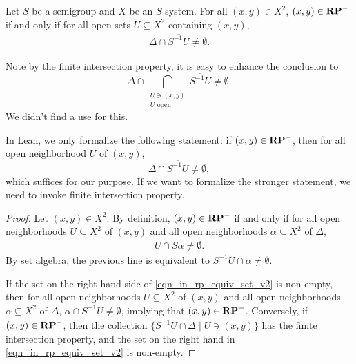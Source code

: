 \begin{lemma}
\label{lemma_rp_iff_nbhd_tran_int_hits_diagonal}
\leanok{}
    Let $S$ be a semigroup and $X$ be an $S$-system.  For all $(x,y) \in X^2$, $(x,y) \in \mathbf{RP}^-$ if and only if for all open sets $U \subseteq X^2$ containing $(x,y)$,
    \begin{align}
    \label{eqn_in_rp_equiv_set_v2}
         \Delta \cap \overline{S^{-1} U} \neq \emptyset.
    \end{align}
\end{lemma}
\begin{remark}
    Note by the finite intersection property, it is easy to enhance the conclusion to
    \[\Delta \cap \bigcap_{\substack{U \ni (x,y) \\ U \text{ open}}} \overline{S^{-1} U} \neq \emptyset.\]
    We didn't find a use for this.
\end{remark}
\begin{remark}
In Lean, we only formalize the following statement:
if $(x, y) \in \mathbf{RP}^-$, then for all open neighborhood $U$ of $(x, y)$, 
\[
    \Delta \cap \overline{S^{-1} U} \neq \emptyset,
\]
which suffices for our purpose.
If we want to formalize the stronger statement, we need to invoke finite intersection property.     
\end{remark}

\begin{proof}
\leanok{}
    Let $(x,y) \in X^2$. By definition, $(x,y) \in \mathbf{RP}^-$ if and only if for all open neighborhoods $U \subseteq X^2$ of $(x,y)$ and all open neighborhoods $\alpha \subseteq X^2$ of $\Delta$,
    \begin{align*}
        U \cap S\alpha \neq \emptyset.
    \end{align*}
    By set algebra, the previous line is equivalent to $S^{-1} U \cap \alpha \neq \emptyset.$

    
    If the set on the right hand side of \eqref{eqn_in_rp_equiv_set_v2} is non-empty, then for all open neighborhoods $U \subseteq X^2$ of $(x,y)$ and all open neighborhoods $\alpha \subseteq X^2$ of $\Delta$, $\alpha \cap S^{-1}U \neq \emptyset$, implying that $(x,y) \in \mathbf{RP}^-$.
    Conversely, if $(x,y) \in \mathbf{RP}^-$, then the collection $\{\overline{S^{-1}U} \cap \Delta \mid U \ni (x,y)\}$ has the finite intersection property, and the set on the right hand in \eqref{eqn_in_rp_equiv_set_v2} is non-empty.
\end{proof}

